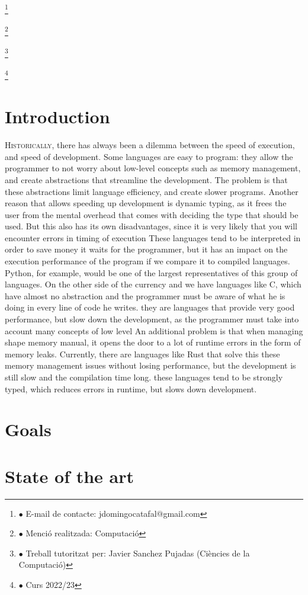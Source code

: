 ﻿\documentclass[10pt,a4paper,twocolumn,twoside]{article}
\newcommand\blfootnote[1]{%
  \begingroup
  \renewcommand\thefootnote{}\footnote{#1}%
  \addtocounter{footnote}{-1}%
  \endgroup
}
\begin{document}
\blfootnote{$\bullet$ E-mail de contacte: jdomingocatafal@gmail.com}
\blfootnote{$\bullet$ Menció realitzada: Computació}
\blfootnote{$\bullet$ Treball tutoritzat per: Javier Sanchez Pujadas (Ciències de la Computació)}
\blfootnote{$\bullet$ Curs 2022/23}

\section{Introduction}
\lettrine[lines=3]{H}{istorically}, there has always been a dilemma between the
speed of execution, and speed of development. Some languages are easy to
program: they allow the programmer to not worry about low-level concepts such as
memory management, and create abstractions that streamline the development. The
problem is that these abstractions limit language efficiency, and create slower
programs. Another reason that allows speeding up development is dynamic typing,
as it frees the user from the mental overhead that comes with deciding the type
that should be used. But this also has its own disadvantages, since it is very
likely that you will encounter errors in timing of execution These languages
tend to be interpreted in order to save money it waits for the programmer, but
it has an impact on the execution performance of the program if we compare it to
compiled languages. Python, for example, would be one of the largest
representatives of this group of languages. On the other side of the currency
and we have languages like C, which have almost no abstraction and the
programmer must be aware of what he is doing in every line of code he writes.
they are languages that provide very good performance, but slow down the
development, as the programmer must take into account many concepts of low level
An additional problem is that when managing shape memory manual, it opens the
door to a lot of runtime errors in the form of memory leaks. Currently, there
are languages like Rust that solve this these memory management issues without
losing performance, but the development is still slow and the compilation time
long. these languages tend to be strongly typed, which reduces errors in
runtime, but slows down development.

\section{Goals}

\section{State of the art}
\end{document}
